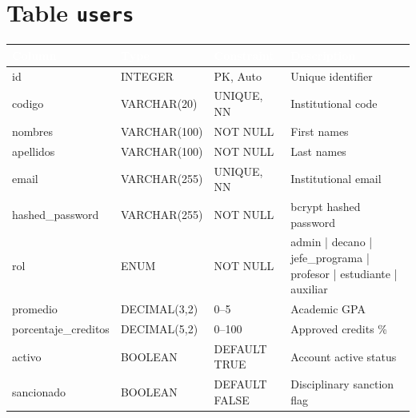 \documentclass[12pt,a4paper,twoside]{report}
\begin{document}
\section{Table \texttt{users}}
\begin{center}
\begin{tabularx}{\textwidth}{|l|l|l|X|}
\hline
\rowcolor{tableHdr}
\textcolor{white}{\textbf{Column}} & \textcolor{white}{\textbf{Type}} &
\textcolor{white}{\textbf{Constraint}} & \textcolor{white}{\textbf{Description}} \\
\hline
\rowcolor{rowOdd}id & INTEGER & PK, Auto & Unique identifier \\
\hline\rowcolor{rowEven}codigo & VARCHAR(20) & UNIQUE, NN & Institutional code \\
\hline\rowcolor{rowOdd}nombres & VARCHAR(100) & NOT NULL & First names \\
\hline\rowcolor{rowEven}apellidos & VARCHAR(100) & NOT NULL & Last names \\
\hline\rowcolor{rowOdd}email & VARCHAR(255) & UNIQUE, NN & Institutional email \\
\hline\rowcolor{rowEven}hashed\_password & VARCHAR(255) & NOT NULL & bcrypt hashed password \\
\hline\rowcolor{rowOdd}rol & ENUM & NOT NULL & admin | decano | jefe\_programa | profesor | estudiante | auxiliar \\
\hline\rowcolor{rowEven}promedio & DECIMAL(3,2) & 0--5 & Academic GPA \\
\hline\rowcolor{rowOdd}porcentaje\_creditos & DECIMAL(5,2) & 0--100 & Approved credits \% \\
\hline\rowcolor{rowEven}activo & BOOLEAN & DEFAULT TRUE & Account active status \\
\hline\rowcolor{rowOdd}sancionado & BOOLEAN & DEFAULT FALSE & Disciplinary sanction flag \\
\hline
\end{tabularx}
\end{center}
\end{document}
